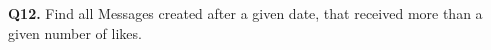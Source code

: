 \textbf{Q12.}
Find all Messages created after a given date, that received more than a
given number of likes.
